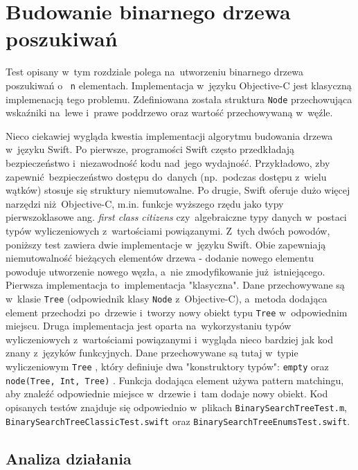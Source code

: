 \documentclass[mgr, shortabstract]{iithesis}
\newcommand{\ang}[1]{ang. \textit{#1}}
\newcommand{\swiftinline}[1]{
    \texttt{#1}
}
\newcommand{\objcinline}[1]{
    \texttt{#1}
}
\begin{document}
\section{Budowanie binarnego drzewa poszukiwań}

Test opisany w~tym rozdziale polega na~utworzeniu binarnego drzewa poszukiwań o~\swiftinline{n} elementach. Implementacja w~języku Objective-C jest klasyczną implemenacją tego problemu. Zdefiniowana została struktura \objcinline{Node} przechowująca wskaźniki na~lewe i~prawe poddrzewo oraz wartość przechowywaną w~węźle.

Nieco ciekawiej wygląda kwestia implementacji algorytmu budowania drzewa w~języku Swift. Po pierwsze, programości Swift często przedkładają bezpieczeństwo i~niezawodność kodu nad~jego wydajność. Przykładowo, zby zapewnić bezpieczeństwo dostępu do~danych (np.~podczas dostępu z~wielu wątków) stosuje się struktury niemutowalne. Po drugie, Swift oferuje dużo więcej narzędzi niż Objective-C, m.in. funkcje wyższego rzędu jako typy pierwszoklasowe \ang{first class citizens} czy~algebraiczne typy danych w~postaci typów wyliczeniowych z~wartościami powiązanymi. Z~tych dwóch powodów, poniższy test zawiera dwie implementacje w~języku Swift. Obie zapewniają niemutowalność bieżących elementów drzewa - dodanie nowego elementu powoduje utworzenie nowego węzła, a~nie zmodyfikowanie już istniejącego. Pierwsza implementacja to~implementacja "klasyczna". Dane przechowywane są w~klasie \swiftinline{Tree} (odpowiednik klasy \objcinline{Node} z~Objective-C), a~metoda dodająca element przechodzi po~drzewie i~tworzy nowy obiekt typu \swiftinline{Tree} w~odpowiednim miejscu. Druga implementacja jest oparta na~wykorzystaniu typów wyliczeniowych z~wartościami powiązanymi i~wygląda nieco bardziej jak kod znany z~języków funkcyjnych. Dane przechowywane są tutaj w~typie wyliczeniowym \swiftinline{Tree}, który definiuje dwa "konstruktory typów": \swiftinline{empty} oraz \swiftinline{node(Tree, Int, Tree)}. Funkcja dodająca element używa pattern matchingu, aby znaleźć odpowiednie miejsce w~drzewie i~tam dodaje nowy obiekt. Kod opisanych testów znajduje się odpowiednio w~plikach \texttt{BinarySearchTreeTest.m}, \texttt{BinarySearchTreeClassicTest.swift} oraz \texttt{BinarySearchTreeEnumsTest.swift}.

\subsection{Analiza działania}
\end{document}
